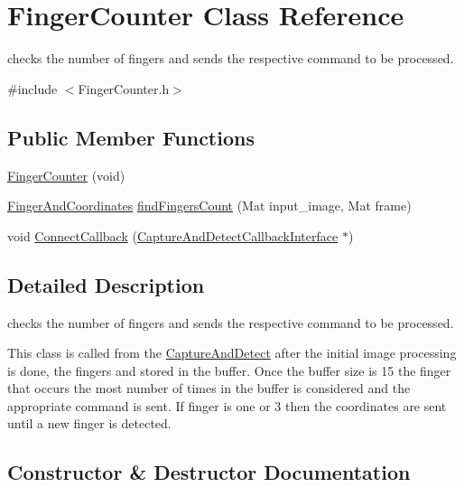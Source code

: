 \hypertarget{classFingerCounter}{}\section{Finger\+Counter Class Reference}
\label{classFingerCounter}


checks the number of fingers and sends the respective command to be processed.  




{\ttfamily \#include $<$Finger\+Counter.\+h$>$}

\subsection*{Public Member Functions}
\begin{DoxyCompactItemize}
\item 
\hyperlink{classFingerCounter_a2f6f5bc97506e87dc7acc6e02579a916}{Finger\+Counter} (void)
\item 
\hyperlink{classFingerAndCoordinates}{Finger\+And\+Coordinates} \hyperlink{classFingerCounter_a611201352a86dd943f866c1be9507081}{find\+Fingers\+Count} (Mat input\+\_\+image, Mat frame)
\item 
void \hyperlink{classFingerCounter_a5b5aabaa39ff05c70a873b4c2a7869f9}{Connect\+Callback} (\hyperlink{classCaptureAndDetectCallbackInterface}{Capture\+And\+Detect\+Callback\+Interface} $\ast$)
\end{DoxyCompactItemize}


\subsection{Detailed Description}
checks the number of fingers and sends the respective command to be processed. 

This class is called from the \hyperlink{classCaptureAndDetect}{Capture\+And\+Detect} after the initial image processing is done, the fingers and stored in the buffer. Once the buffer size is 15 the finger that occurs the most number of times in the buffer is considered and the appropriate command is sent. If finger is one or 3 then the coordinates are sent until a new finger is detected. 

\subsection{Constructor \& Destructor Documentation}
\mbox{\label{classFingerCounter_a2f6f5bc97506e87dc7acc6e02579a916}} 
